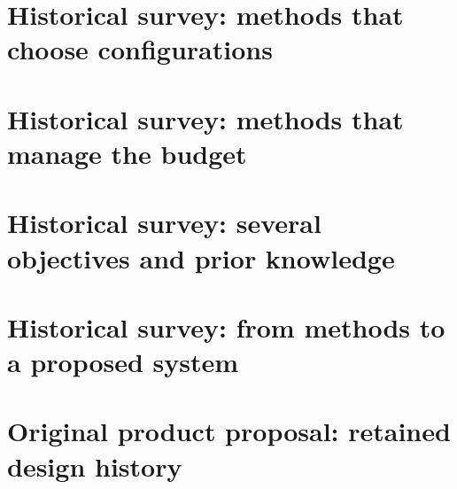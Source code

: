 \documentclass[11pt]{report}
\begin{document}
\part{Historical survey: methods that choose configurations}



\part{Historical survey: methods that manage the budget}



\part{Historical survey: several objectives and prior knowledge}



\part{Historical survey: from methods to a proposed system}



\part{Original product proposal: retained design history}







\clearpage

\end{document}
